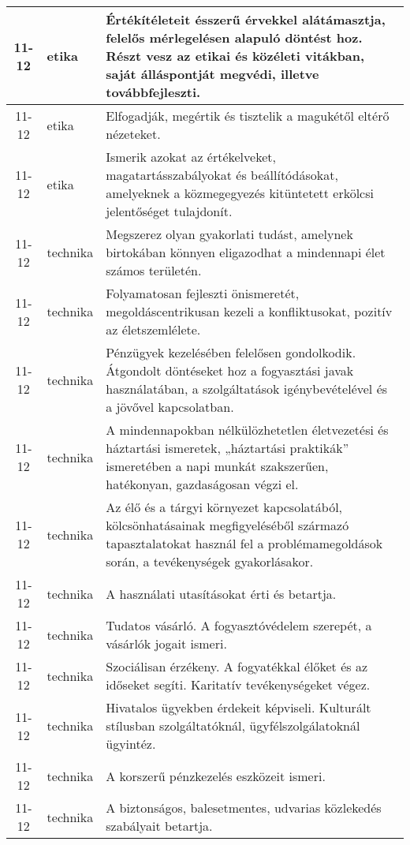 \begin{small}
\begin{longtable}{c | p{2cm} |  p{11cm} }
              11-12 & etika & Értékítéleteit ésszerű érvekkel alátámasztja, felelős mérlegelésen alapuló döntést hoz. Részt vesz az etikai és közéleti vitákban, saját álláspontját megvédi, illetve továbbfejleszti. \\ \hline
              11-12 & etika & Elfogadják, megértik és tisztelik a magukétől eltérő nézeteket. \\ \hline
              11-12 & etika & Ismerik azokat az értékelveket, magatartásszabályokat és beállítódásokat, amelyeknek a közmegegyezés kitüntetett erkölcsi jelentőséget tulajdonít. \\ \hline
              11-12 & technika & Megszerez olyan gyakorlati tudást, amelynek birtokában könnyen eligazodhat a mindennapi élet számos területén. \\ \hline
              11-12 & technika & Folyamatosan fejleszti önismeretét, megoldáscentrikusan kezeli a konfliktusokat,  pozitív az életszemlélete. \\ \hline
              11-12 & technika & Pénzügyek kezelésében felelősen gondolkodik. Átgondolt döntéseket hoz a fogyasztási javak használatában, a szolgáltatások igénybevételével és a jövővel kapcsolatban. \\ \hline
              11-12 & technika & A mindennapokban nélkülözhetetlen életvezetési és háztartási ismeretek, „háztartási praktikák” ismeretében a napi munkát szakszerűen, hatékonyan, gazdaságosan végzi el. \\ \hline
              11-12 & technika & Az élő és a tárgyi környezet kapcsolatából, kölcsönhatásainak megfigyeléséből származó tapasztalatokat használ fel a problémamegoldások során, a tevékenységek gyakorlásakor. \\ \hline
              11-12 & technika & A használati utasításokat érti és betartja. \\ \hline
              11-12 & technika & Tudatos vásárló. A fogyasztóvédelem szerepét, a vásárlók jogait ismeri. \\ \hline
              11-12 & technika & Szociálisan érzékeny. A fogyatékkal élőket és az időseket segíti. Karitatív tevékenységeket végez. \\ \hline
              11-12 & technika & Hivatalos ügyekben érdekeit képviseli. Kulturált stílusban szolgáltatóknál, ügyfélszolgálatoknál ügyintéz. \\ \hline
              11-12 & technika & A korszerű pénzkezelés eszközeit ismeri. \\ \hline
              11-12 & technika & A biztonságos, balesetmentes, udvarias közlekedés szabályait betartja. \\ \hline

\end{longtable}
\end{small}
